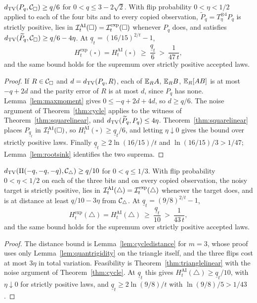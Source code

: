 \begin{corollary}\label{cor:squaredistance}
$d_{\operatorname{TV}}(P_q,\mathcal C_{\square})\ge q/6$ for $0<q\le3-2\sqrt2$. With flip probability $0<\eta<1/2$ applied to each of the four bits and to every copied observation, $\widetilde P_q=T_\eta^{\otimes4}P_q$ is strictly positive, lies in $\mathcal I^{\mathrm{AI}}_t(\square)=\mathcal I^{\mathrm{exp}}_t(\square)$ whenever $P_q$ does, and satisfies $d_{\operatorname{TV}}(\widetilde P_q,\mathcal C_{\square})\ge q/6-4\eta$. At $\underline q_t=(16/15)^{2/t}-1$,
\[
H^{\mathrm{exp}}_t(\square)=H^{\mathrm{AI}}_t(\square)\ \ge\ \frac{\underline q_t}6\ >\ \frac1{47\,t},
\]
and the same bound holds for the supremum over strictly positive accepted laws.
\end{corollary}

\begin{proof}
If $R\in\mathcal C_{\square}$ and $d=d_{\operatorname{TV}}(P_q,R)$, each of $\mathbb E_RA$, $\mathbb E_RB$, $\mathbb E_R[AB]$ is at most $-q+2d$ and the parity error of $R$ is at most $d$, since $P_q$ has none. Lemma~\ref{lem:maxmoment} gives $0\le-q+2d+4d$, so $d\ge q/6$. The noise argument of Theorem~\ref{thm:cycle} applies to the witness of Theorem~\ref{thm:squarelinear}, and $d_{\operatorname{TV}}(\widetilde P_q,P_q)\le4\eta$. Theorem~\ref{thm:squarelinear} places $P_{\underline q_t}$ in $\mathcal I^{\mathrm{AI}}_t(\square)$, so $H^{\mathrm{AI}}_t(\square)\ge \underline q_t/6$, and letting $\eta\downarrow0$ gives the bound over strictly positive laws. Finally $\underline q_t\ge2\ln(16/15)/t$ and $\ln(16/15)/3>1/47$; Lemma~\ref{lem:rootsink} identifies the two suprema.
\end{proof}

\begin{corollary}\label{cor:triangledistance}
$d_{\operatorname{TV}}(\Pi(-q,-q,-q),\mathcal C_{\triangle})\ge q/10$ for $0<q\le1/3$. With flip probability $0<\eta<1/2$ on each of the three bits and on every copied observation, the noisy target is strictly positive, lies in $\mathcal I^{\mathrm{AI}}_t(\triangle)=\mathcal I^{\mathrm{exp}}_t(\triangle)$ whenever the target does, and is at distance at least $q/10-3\eta$ from $\mathcal C_{\triangle}$. At $\underline q_t=(9/8)^{2/t}-1$,
\[
H^{\mathrm{exp}}_t(\triangle)=H^{\mathrm{AI}}_t(\triangle)\ \ge\ \frac{\underline q_t}{10}\ >\ \frac1{43\,t},
\]
and the same bound holds for the supremum over strictly positive accepted laws.
\end{corollary}

\begin{proof}
The distance bound is Lemma~\ref{lem:cycledistance} for $m=3$, whose proof uses only Lemma~\ref{lem:quantrigidity} on the triangle itself, and the three flips cost at most $3\eta$ in total variation. Feasibility is Theorem~\ref{thm:trianglelinear} with the noise argument of Theorem~\ref{thm:cycle}. At $\underline q_t$ this gives $H^{\mathrm{AI}}_t(\triangle)\ge \underline q_t/10$, with $\eta\downarrow0$ for strictly positive laws, and $\underline q_t\ge2\ln(9/8)/t$ with $\ln(9/8)/5>1/43$.
\end{proof}

